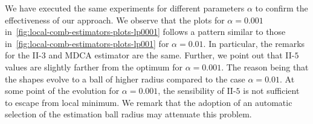We have executed the same experiments for different parameters $\alpha$ to confirm the effectiveness of our approach. We observe that the plots for $\alpha=0.001$ in~\cref{fig:local-comb-estimators-plots-lp0001} follows a pattern similar to those in~\cref{fig:local-comb-estimators-plots-lp001} for $\alpha=0.01$. In particular, the remarks for the II-$3$ and MDCA estimator are the same. Further, we point out that II-$5$ values are slightly farther from the optimum for $\alpha=0.001$. The reason being that the shapes evolve to a ball of higher radius compared to the case $\alpha=0.01$. At some point of the evolution for $\alpha=0.001$, the sensibility of II-$5$ is not sufficient to escape from local minimum. We remark that the adoption of an automatic selection of the estimation ball radius may attenuate this problem.



